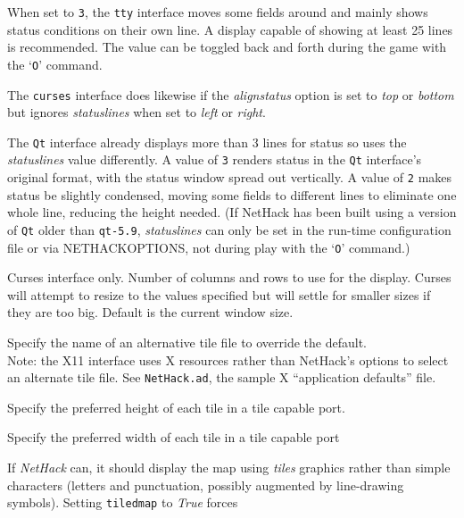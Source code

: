 \documentclass[titlepage]{article}
\begin{document}
\begin{description}[font=\mdseries\itshape]
When set to \texttt{3}, the \texttt{tty} interface moves some fields around and
mainly shows status conditions on their own line.
A display capable of showing at least 25 lines is recommended.
The value can be toggled back and forth during the game with the `\texttt{O}'
command.

The \texttt{curses} interface does likewise if the
\textit{align\textunderscore status}
option is set to \textit{top} or \textit{bottom} but ignores
\textit{statuslines}
when set to \textit{left} or \textit{right}.

The \texttt{Qt} interface already displays more than 3 lines for status
so uses the
\textit{statuslines}
value differently.
A value of \texttt{3} renders status in the \texttt{Qt} interface's
original format, with the status window spread out vertically.
A value of \texttt{2} makes status be slightly condensed, moving some
fields to different lines to eliminate one whole line, reducing the
height needed.
(If NetHack has been built using a version of \texttt{Qt}
older than \texttt{qt-5.9},
\textit{statuslines}
can only be set in the run-time configuration file or via NETHACKOPTIONS,
not during play with the `\texttt{O}' command.)
\item[term\textunderscore cols \textrm{and}]
\item[term\textunderscore rows]
Curses interface only.
Number of columns and rows to use for the display.
Curses will attempt to resize to the values specified but will settle
for smaller sizes if they are too big.
Default is the current window size.
\item[tile\textunderscore file]
Specify the name of an alternative tile file to override the default.
\\
Note: the X11 interface uses X resources rather than NetHack's options
to select an alternate tile file.
See \texttt{NetHack.ad}, the sample X ``application defaults'' file.
\item[tile\textunderscore height]
Specify the preferred height of each tile in a tile capable port.
\item[tile\textunderscore width]
Specify the preferred width of each tile in a tile capable port
\item[tiled\textunderscore map]
If \textit{NetHack} can, it should display the map using \textit{tiles} graphics
rather than simple characters (letters and punctuation, possibly
augmented by line-drawing symbols).
Setting \texttt{tiled\textunderscore map} to \textit{True} forces

\end{description}
\end{document}
